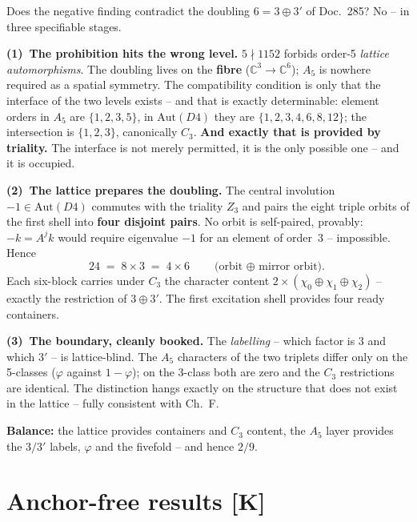 Does the negative finding contradict the doubling $6 = 3\oplus3'$ of
Doc.~285? No -- in three specifiable stages.

\textbf{(1)~The prohibition hits the wrong level.} $5\nmid1152$
forbids order-5 \emph{lattice automorphisms}. The doubling lives on
the \textbf{fibre} ($\mathbb{C}^3\to\mathbb{C}^6$); $A_5$ is nowhere
required as a spatial symmetry. The compatibility condition is only
that the interface of the two levels exists -- and that is exactly
determinable: element orders in $A_5$ are $\{1,2,3,5\}$, in
$\text{Aut}(D4)$ they are $\{1,2,3,4,6,8,12\}$; the intersection is
$\{1,2,3\}$, canonically $C_3$. \textbf{And exactly that is provided
by triality.} The interface is not merely permitted, it is the only
possible one -- and it is occupied.

\textbf{(2)~The lattice prepares the doubling.} The central
involution $-1 \in \text{Aut}(D4)$ commutes with the triality $Z_3$
and pairs the eight triple orbits of the first shell into
\textbf{four disjoint pairs}. No orbit is self-paired, provably:
$-k = A^j k$ would require eigenvalue $-1$ for an element of
order~3 -- impossible. Hence
\begin{equation}
  24 \;=\; 8\times3 \;=\; 4\times6
  \qquad\text{(orbit $\oplus$ mirror orbit).}
\end{equation}
Each six-block carries under $C_3$ the character content
$2\times(\chi_0\oplus\chi_1\oplus\chi_2)$ -- exactly the restriction
of $3\oplus3'$. The first excitation shell provides four ready
containers.

\textbf{(3)~The boundary, cleanly booked.} The \emph{labelling} --
which factor is $3$ and which $3'$ -- is lattice-blind. The $A_5$
characters of the two triplets differ only on the 5-classes
($\varphi$ against $1-\varphi$); on the 3-class both are zero and
the $C_3$ restrictions are identical. The distinction hangs exactly
on the structure that does not exist in the lattice -- fully
consistent with Ch.~F.

\textbf{Balance:} the lattice provides containers and $C_3$ content,
the $A_5$ layer provides the $3/3'$ labels, $\varphi$ and the
fivefold -- and hence $2/9$.

\chapter{Anchor-free results [K]}

